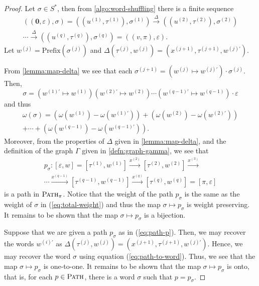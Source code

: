 \begin{proof}
Let $\sigma \in S^*$, then from \cref{algo:word-shuffling} there is a finite sequence
\begin{multline}\label{eq:delta-sequence}
	((\mathbf{0},\varepsilon),\sigma)
	=
	((u^{(1)},\tau^{(1)}),\sigma^{(1)})
	\xrightarrow{\Delta}
	((u^{(2)},\tau^{(2)}),\sigma^{(2)})
	\\\cdots
	\xrightarrow{\Delta}
	((u^{(q)},\tau^{(q)}),\sigma^{(q)})
	=
	((v,\pi),\varepsilon).
\end{multline}
Let  $w^{(j)} = \mathrm{Prefix}(\sigma^{(j)})$ and $\Delta(\tau^{(j)},w^{(j)}) = (x^{(j+1)},\tau^{(j+1)},w^{(j)\prime})$.

From \cref{lemma:map-delta} we see that each $\sigma^{(j+1)} = (w^{(j)}\mapsto w^{(j)\prime})\cdot \sigma^{(j)}$.
Then,
\begin{equation}\label{eq:path-to-word}
	\sigma
	=
	(w^{(1)\prime}\mapsto w^{(1)})
	(w^{(2)\prime}\mapsto w^{(2)})
	\cdots
	(w^{(q-1)\prime}\mapsto w^{(q-1)})
	\cdot
	\varepsilon
\end{equation}
and thus
\begin{multline}\label{eq:total-weight}
	\omega(\sigma)
	=
	(\omega(w^{(1)}) - \omega(w^{(1)\prime}))
	+ (\omega(w^{(2)}) - \omega(w^{(2)\prime}))\\
	+ \cdots
	+ (\omega(w^{(q-1)}) - \omega(w^{(q-1)\prime})).
\end{multline}
Moreover, from the properties of $\Delta$ given in \cref{lemma:map-delta}, and the definition of the graph $\Gamma$ given in \cref{defn:graph-gamma}, we see that
\begin{multline}\label{eq:path-p}
	p_\sigma \colon
	[\varepsilon,w]
	=
		[\tau^{(1)}, w^{(1)}]
	\xrightarrow{x^{(2)}}
		[\tau^{(2)}, w^{(2)}]
	\xrightarrow{x^{(3)}}\\
	\cdots
	\xrightarrow{x^{(q-1)}}
		[\tau^{(q-1)}, w^{(q-1)}]
	\xrightarrow{x^{(q)}}
		[\tau^{(q)}, w^{(q)}]
	= [\pi, \varepsilon]
\end{multline}
is a path in $\textsc{Path}_\pi$.
Notice that the weight of the path $p_\sigma$ is the same as the weight of $\sigma$ in (\ref{eq:total-weight}) and thus the map $\sigma \mapsto p_\sigma$ is weight preserving.
It remains to be shown that the map $\sigma \mapsto p_\sigma$ is a bijection.

Suppose that we are given a path $p_\sigma$ as in (\ref{eq:path-p}).
Then, we may recover the words $w^{(i)\prime}$ as $\Delta(\tau^{(j)},w^{(j)}) = (x^{(j+1)},\tau^{(j+1)},w^{(j)\prime})$.
Hence, we may recover the word $\sigma$ using equation (\ref{eq:path-to-word}).
Thus, we see that the map $\sigma \mapsto p_\sigma$ is one-to-one.
It remains to be shown that the map $\sigma \mapsto p_\sigma$ is onto, that is, for each $p \in \textsc{Path}$, there is a word $\sigma$ such that $p = p_\sigma$.


\end{proof}
